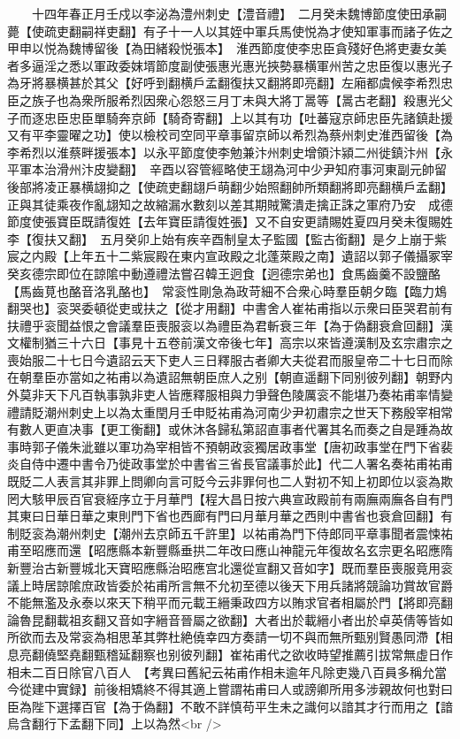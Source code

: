 　　十四年春正月壬戍以李泌為澧州刺史【澧音禮】　二月癸未魏博節度使田承嗣薨【使疏吏翻嗣祥吏翻】有子十一人以其姪中軍兵馬使悦為才使知軍事而諸子佐之甲申以悦為魏博留後【為田緒殺悦張本】　淮西節度使李忠臣貪殘好色將吏妻女美者多逼淫之悉以軍政委妺壻節度副使張惠光惠光挾勢暴横軍州苦之忠臣復以惠光子為牙將暴横甚於其父【好呼到翻横戶孟翻復扶又翻將即亮翻】左廂都虞候李希烈忠臣之族子也為衆所服希烈因衆心怨怒三月丁未與大將丁暠等【暠古老翻】殺惠光父子而逐忠臣忠臣單騎奔京師【騎奇寄翻】上以其有功【吐蕃寇京師忠臣先諸鎮赴援又有平李靈曜之功】使以檢校司空同平章事留京師以希烈為蔡州刺史淮西留後【為李希烈以淮蔡畔援張本】以永平節度使李勉兼汴州刺史增領汴潁二州徙鎮汴州【永平軍本治滑州汴皮變翻】　辛酉以容管經略使王翃為河中少尹知府事河東副元帥留後部將凌正暴横翃抑之【使疏吏翻翃戶萌翻少始照翻帥所類翻將即亮翻横戶孟翻】正與其徒乘夜作亂翃知之故縮漏水數刻以差其期賊驚潰走擒正誅之軍府乃安　成德節度使張寶臣既請復姓【去年寶臣請復姓張】又不自安更請賜姓夏四月癸未復賜姓李【復扶又翻】　五月癸卯上始有疾辛酉制皇太子監國【監古銜翻】是夕上崩于紫宸之内殿【上年五十二紫宸殿在東内宣政殿之北蓬萊殿之南】遺詔以郭子儀攝冢宰癸亥德宗即位在諒隂中動遵禮法嘗召韓王迥食【迥德宗弟也】食馬齒羹不設鹽酪【馬齒莧也酪音洛乳酪也】　常衮性剛急為政苛細不合衆心時羣臣朝夕臨【臨力鴆翻哭也】衮哭委頓從吏或扶之【從才用翻】中書舍人崔祐甫指以示衆曰臣哭君前有扶禮乎衮聞益恨之會議羣臣喪服衮以為禮臣為君斬衰三年【為于偽翻衰倉回翻】漢文權制猶三十六日【事見十五卷前漢文帝後七年】高宗以來皆遵漢制及玄宗肅宗之喪始服二十七日今遺詔云天下吏人三日釋服古者卿大夫從君而服皇帝二十七日而除在朝羣臣亦當如之祐甫以為遺詔無朝臣庶人之别【朝直遥翻下同别彼列翻】朝野内外莫非天下凡百執事孰非吏人皆應釋服相與力爭聲色陵厲衮不能堪乃奏祐甫率情變禮請貶潮州刺史上以為太重閏月壬申貶祐甫為河南少尹初肅宗之世天下務殷宰相常有數人更直决事【更工衡翻】或休沐各歸私第詔直事者代署其名而奏之自是踵為故事時郭子儀朱泚雖以軍功為宰相皆不預朝政衮獨居政事堂【唐初政事堂在門下省裴炎自侍中遷中書令乃徙政事堂於中書省三省長官議事於此】代二人署名奏祐甫祐甫既貶二人表言其非罪上問卿向言可貶今云非罪何也二人對初不知上初即位以衮為欺罔大駭甲辰百官衰絰序立于月華門【程大昌日按六典宣政殿前有兩廡兩廡各自有門其東曰日華日華之東則門下省也西廊有門曰月華月華之西則中書省也衰倉回翻】有制貶衮為潮州刺史【潮州去京師五千許里】以祐甫為門下侍郎同平章事聞者震悚祐甫至昭應而還【昭應縣本新豐縣垂拱二年改曰應山神龍元年復故名玄宗更名昭應隋新豐治古新豐城北天寶昭應縣治昭應宫北還從宣翻又音如字】既而羣臣喪服竟用衮議上時居諒隂庶政皆委於祐甫所言無不允初至德以後天下用兵諸將競論功賞故官爵不能無濫及永泰以來天下稍平而元載王縉秉政四方以賄求官者相屬於門【將即亮翻論魯昆翻載祖亥翻又音如字縉音晉屬之欲翻】大者出於載縉小者出於卓英倩等皆如所欲而去及常衮為相思革其弊杜絶僥幸四方奏請一切不與而無所甄别賢愚同滯【相息亮翻僥堅堯翻甄稽延翻察也别彼列翻】崔祐甫代之欲收時望推薦引拔常無虛日作相未二百日除官八百人　【考異曰舊紀云祐甫作相未逾年凡除吏幾八百員多稱允當今從建中實録】前後相矯終不得其適上嘗謂祐甫曰人或謗卿所用多涉親故何也對曰臣為陛下選擇百官【為于偽翻】不敢不詳慎苟平生未之識何以諳其才行而用之【諳烏含翻行下孟翻下同】上以為然<br />

